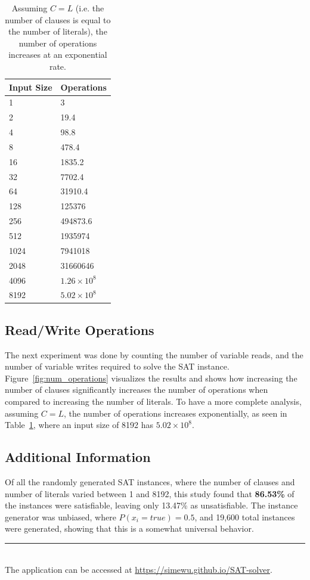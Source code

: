 \documentclass[runningheads]{llncs}
\begin{document}
\begin{table}[]
\centering
\tiny
\begin{tabular}{l|l}
Input Size & Operations \\ \hline
1          & 3          \\
2          & 19.4       \\
4          & 98.8       \\
8          & 478.4      \\
16         & 1835.2     \\
32         & 7702.4     \\
64         & 31910.4    \\
128        & 125376     \\
256        & 494873.6   \\
512        & 1935974    \\
1024       & 7941018    \\
2048       & 31660646   \\
4096       & $1.26\times 10^8$   \\
8192       & $5.02\times 10^8$  
\end{tabular}
\caption{Assuming $C=L$ (i.e. the number of clauses is equal to the number of literals), the number of operations increases at an exponential rate.}
\label{tab:operations-table}
\end{table}

\subsection{Read/Write Operations}
The next experiment was done by counting the number of variable reads, and the number of variable writes required to solve the SAT instance. Figure~\ref{fig:num_operations} visualizes the results and shows how increasing the number of clauses significantly increases the number of operations when compared to increasing the number of literals. To have a more complete analysis, assuming $C=L$, the number of operations increases exponentially, as seen in Table~\ref{tab:operations-table}, where an input size of 8192 has $5.02\times 10^8$.


\clearpage

\subsection{Additional Information}

Of all the randomly generated SAT instances, where the number of clauses and number of literals varied between 1 and 8192, this study found that \textbf{86.53\%} of the instances were satisfiable, leaving only 13.47\% as unsatisfiable. The instance generator was unbiased, where $P(x_i=true) = 0.5$, and 19,600 total instances were generated, showing that this is a somewhat universal behavior.

\noindent\rule{12.5cm}{0.4pt}
\\

The application can be accessed at \url{https://simewu.github.io/SAT-solver}.
\footnotesize


\end{document}
